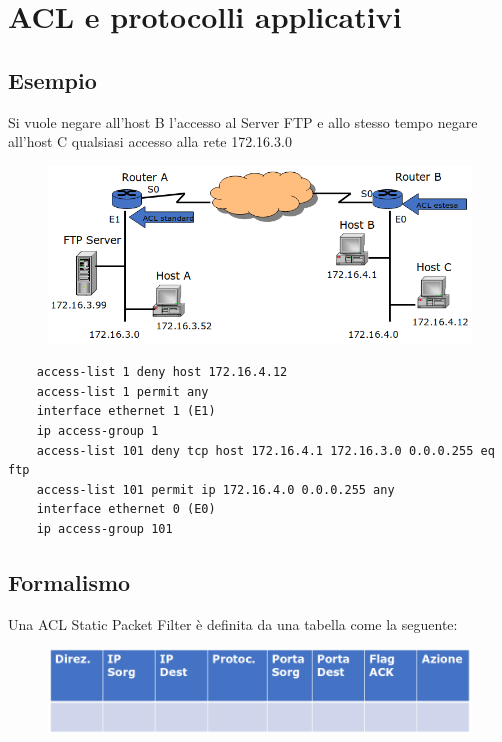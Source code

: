 \section{ACL e protocolli applicativi}

\subsection{Esempio}
Si vuole negare all'host B l'accesso al Server FTP e allo stesso tempo negare all'host C 
qualsiasi accesso alla rete 172.16.3.0

\begin{figure}[H]
    \centering
    \includegraphics[width=1\linewidth]{chapters/11/images/esempio.png}
\end{figure}

\begin{lstlisting}
    access-list 1 deny host 172.16.4.12 
    access-list 1 permit any
    interface ethernet 1 (E1)
    ip access-group 1
    access-list 101 deny tcp host 172.16.4.1 172.16.3.0 0.0.0.255 eq ftp 
    access-list 101 permit ip 172.16.4.0 0.0.0.255 any 
    interface ethernet 0 (E0)
    ip access-group 101
\end{lstlisting}

\subsection{Formalismo}
Una ACL Static Packet Filter è definita da una tabella come la seguente:

\begin{figure}[H]
    \centering
    \includegraphics[width=1\linewidth]{chapters/11/images/tabella.png}
\end{figure}

